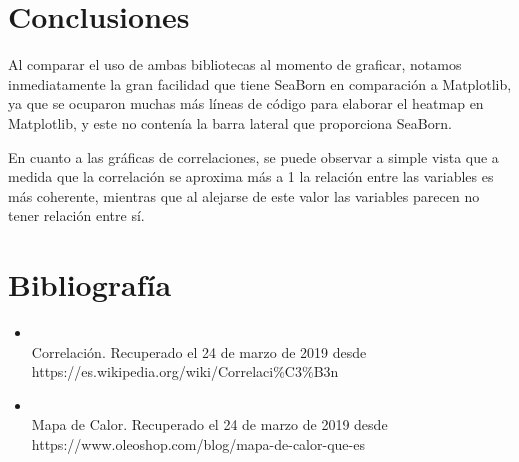 \documentclass[letterpaper,12pt]{article}
\begin{document}
\section{Conclusiones}
Al comparar el uso de ambas bibliotecas al momento de graficar, notamos inmediatamente la gran facilidad que tiene SeaBorn en comparación a Matplotlib, ya que se ocuparon muchas más líneas de código para elaborar el heatmap en Matplotlib, y este no contenía la barra lateral que proporciona SeaBorn.

En cuanto a las gráficas de correlaciones, se puede observar a simple vista que a medida que la correlación se aproxima más a 1 la relación entre las variables es más coherente, mientras que al alejarse de este valor las variables parecen no tener relación entre sí. 

\section*{Bibliografía}
\begin{itemize}

\item \\Correlación. Recuperado el 24 de marzo de 2019 desde \\https://es.wikipedia.org/wiki/Correlaci\%C3\%B3n
\\

\item \\Mapa de Calor. Recuperado el 24 de marzo de 2019 desde \\https://www.oleoshop.com/blog/mapa-de-calor-que-es
\end{itemize}
\end{document}
